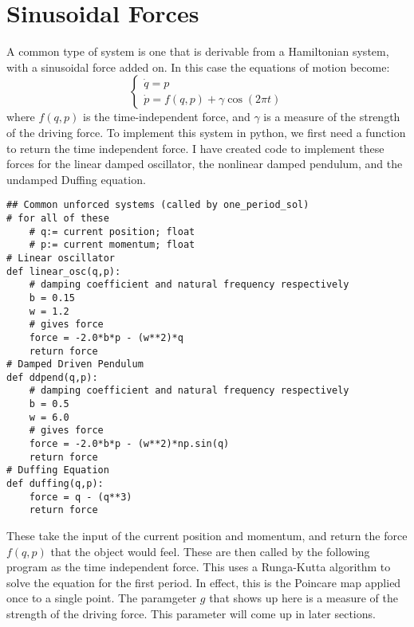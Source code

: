 \documentclass{article}
\newcommand{\syst}[1]{\left\{\begin{matrix}#1 \end{matrix}\right.}
\begin{document}
\section{Sinusoidal Forces}
A common type of system is one that is derivable from a Hamiltonian system, with a sinusoidal force added on. In this case the equations of motion become:
\begin{equation}
    \syst{
        \dot{q}=p\\
        \dot{p}=f(q,p)+ \gamma \cos(2\pi t)
    }
\end{equation}
where $f(q,p)$ is the time-independent force, and $\gamma$ is a measure of the strength of the driving force. To implement this system in python, we first need a function to return the time independent force. I have created code to implement these forces for the linear damped oscillator, the nonlinear damped pendulum, and the undamped Duffing equation.\\
\begin{lstlisting}
## Common unforced systems (called by one_period_sol)
# for all of these
    # q:= current position; float
    # p:= current momentum; float
# Linear oscillator
def linear_osc(q,p):
    # damping coefficient and natural frequency respectively
    b = 0.15
    w = 1.2
    # gives force
    force = -2.0*b*p - (w**2)*q
    return force
# Damped Driven Pendulum
def ddpend(q,p):
    # damping coefficient and natural frequency respectively
    b = 0.5
    w = 6.0
    # gives force
    force = -2.0*b*p - (w**2)*np.sin(q)
    return force
# Duffing Equation
def duffing(q,p):
    force = q - (q**3)
    return force
\end{lstlisting}
These take the input of the current position and momentum, and return the force $f(q,p)$ that the object would feel. These are then called by the following program as the time independent force. This uses a Runga-Kutta algorithm to solve the equation for the first period. In effect, this is the Poincare map applied once to a single point. The paramgeter $g$ that shows up here is a measure of the strength of the driving force. This parameter will come up in later sections.
\end{document}
